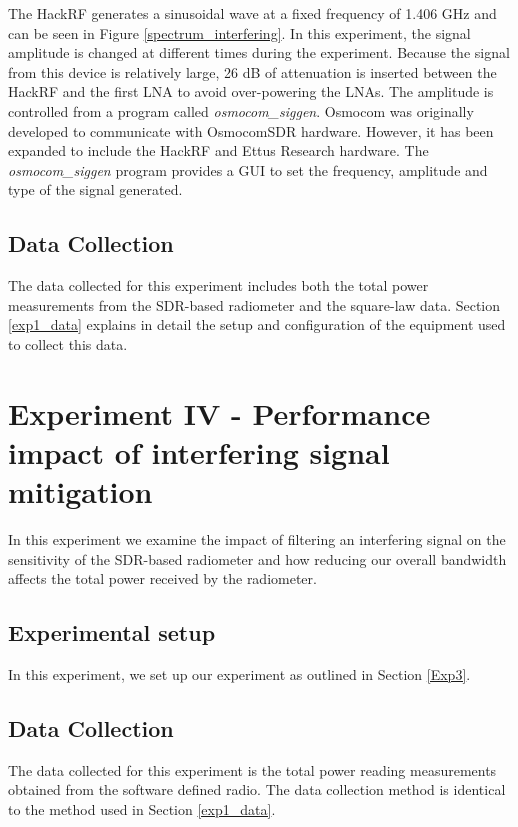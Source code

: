The HackRF generates a sinusoidal wave at a fixed frequency of 1.406 GHz and can be seen in Figure \ref{spectrum_interfering}.  In this experiment, the signal amplitude is changed at different times during the experiment.  Because the signal from this device is relatively large, 26 dB of attenuation is inserted between the HackRF and the first LNA to avoid over-powering the LNAs.  The amplitude is controlled from a program called \emph{osmocom\_siggen}.  Osmocom was originally developed to communicate with OsmocomSDR hardware.  However, it has been expanded to include the HackRF and Ettus Research hardware.  The \emph{osmocom\_siggen} program provides a GUI to set the frequency, amplitude and type of the signal generated.  

\subsection{Data Collection}

The data collected for this experiment includes both the total power measurements from the SDR-based radiometer and the square-law data.  Section \ref{exp1_data} explains in detail the setup and configuration of the equipment used to collect this data.

\section{Experiment IV - Performance impact of interfering signal mitigation}\label{Exp4}

In this experiment we examine the impact of filtering an interfering signal on the sensitivity of the SDR-based radiometer and how reducing our overall bandwidth affects the total power received by the radiometer.

\subsection{Experimental setup} \label{exp4_setup}

In this experiment, we set up our experiment as outlined in Section \ref{Exp3}.

\subsection{Data Collection}

The data collected for this experiment is the total power reading measurements obtained from the software defined radio.  The data collection method is identical to the method used in Section \ref{exp1_data}.

